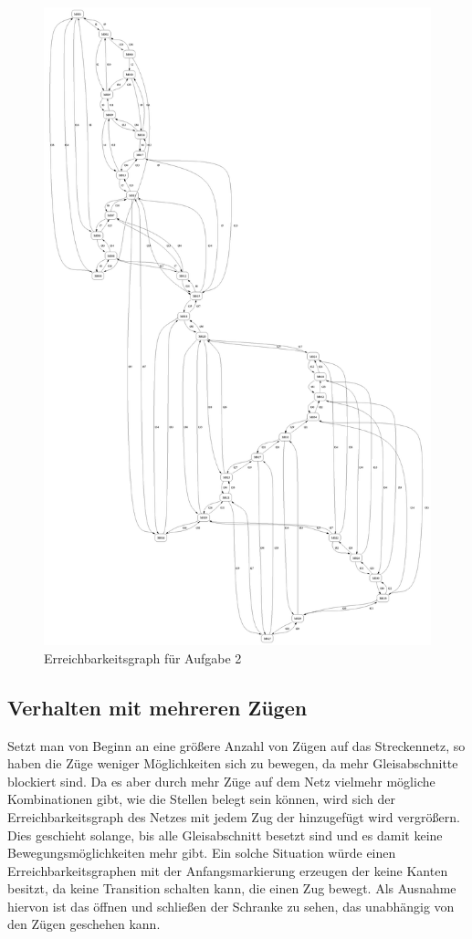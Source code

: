 \documentclass[10pt]{scrartcl}
\begin{document}
\begin{figure}[htbp]
	\centering	\includegraphics[height=1.0\textheight]{Bilder/Aufgabe2_EG.png}
	\caption{Erreichbarkeitsgraph für Aufgabe 2}
	\label{fig:EG2}
\end{figure}

\subsection{Verhalten mit mehreren Zügen}
Setzt man von Beginn an eine größere Anzahl von Zügen auf das Streckennetz, so haben die Züge weniger Möglichkeiten sich zu bewegen, da mehr Gleisabschnitte blockiert sind. Da es aber durch mehr Züge auf dem Netz vielmehr mögliche Kombinationen gibt, wie die Stellen belegt sein können, wird sich der Erreichbarkeitsgraph des Netzes mit jedem Zug der hinzugefügt wird vergrößern. Dies geschieht solange, bis alle Gleisabschnitt besetzt sind und es damit keine Bewegungsmöglichkeiten mehr gibt. Ein solche Situation würde einen Erreichbarkeitsgraphen mit der Anfangsmarkierung erzeugen der keine Kanten besitzt, da keine Transition schalten kann, die einen Zug bewegt. Als Ausnahme hiervon ist das öffnen und schließen der Schranke zu sehen, das unabhängig von den Zügen geschehen kann.
 
\end{document}
